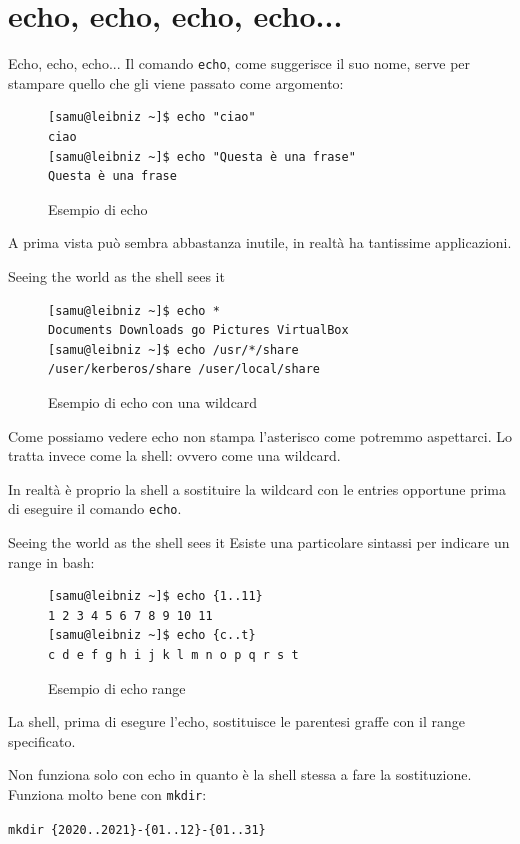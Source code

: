 \documentclass{beamer}
\begin{document}
\section{\Large echo, \small echo, \tiny echo, echo...}
\begin{frame}[fragile]{Echo, \small echo, \tiny echo...}
  Il comando \texttt{echo}, come suggerisce il suo nome, serve per stampare
  quello che gli viene passato come argomento:

  \begin{figure}
    \begin{lstlisting}
[samu@leibniz ~]$ echo "ciao"
ciao
[samu@leibniz ~]$ echo "Questa è una frase"
Questa è una frase
    \end{lstlisting}
    \caption{Esempio di echo}
  \end{figure}
  A prima vista può sembra abbastanza inutile, in realtà ha tantissime
  applicazioni.
\end{frame}

\begin{frame}[fragile]{Seeing the world as the shell sees it}
  \begin{figure}
    \begin{lstlisting}
[samu@leibniz ~]$ echo *
Documents Downloads go Pictures VirtualBox
[samu@leibniz ~]$ echo /usr/*/share
/user/kerberos/share /user/local/share
    \end{lstlisting}
    \caption{Esempio di echo con una wildcard}
  \end{figure}

  Come possiamo vedere echo non stampa l'asterisco come potremmo aspettarci. 
  Lo tratta invece come la shell: ovvero come una wildcard. \medskip \pause

  In realtà è proprio la shell a sostituire la wildcard con le entries opportune
  prima di eseguire il comando \texttt{echo}.
\end{frame}

\begin{frame}[fragile]{Seeing the world as the shell sees it}
  Esiste una particolare sintassi per indicare un range in bash:
  \begin{figure}
    \begin{lstlisting}
[samu@leibniz ~]$ echo {1..11}
1 2 3 4 5 6 7 8 9 10 11
[samu@leibniz ~]$ echo {c..t}
c d e f g h i j k l m n o p q r s t
    \end{lstlisting}
    \caption{Esempio di echo range}
  \end{figure}

  La shell, prima di esegure l'echo, sostituisce le parentesi graffe con il 
  range specificato.\medskip \pause

  Non funziona solo con echo in quanto è la shell stessa a fare la sostituzione.
  Funziona molto bene con \texttt{mkdir}: \smallskip 

  \texttt{mkdir \{2020..2021\}-\{01..12\}-\{01..31\}}
\end{frame}
\end{document}
